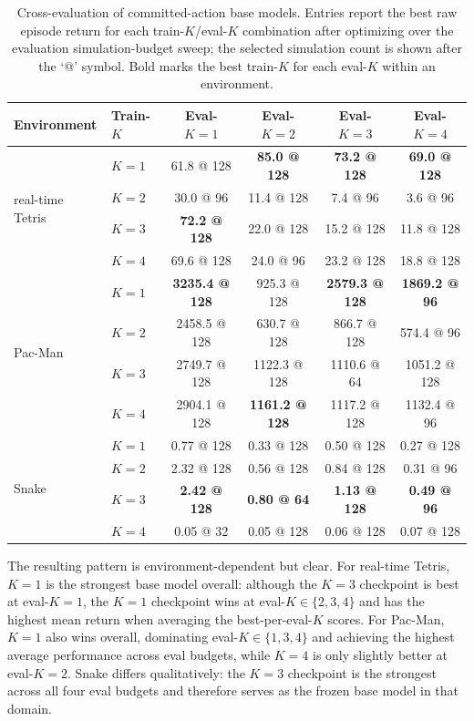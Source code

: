 \documentclass{article}
\begin{document}
\begin{table}[h]
  \centering
  \small
  \setlength{\tabcolsep}{5pt}
  \begin{tabular}{llcccc}
    \toprule
    Environment & Train-$K$ & Eval-$K{=}1$ & Eval-$K{=}2$ & Eval-$K{=}3$ & Eval-$K{=}4$ \\
    \midrule
    \multirow{4}{*}{real-time Tetris}
      & $K{=}1$ & 61.8 @ 128 & \textbf{85.0 @ 128} & \textbf{73.2 @ 128} & \textbf{69.0 @ 128} \\
      & $K{=}2$ & 30.0 @ 96  & 11.4 @ 128          & 7.4 @ 96            & 3.6 @ 96 \\
      & $K{=}3$ & \textbf{72.2 @ 128} & 22.0 @ 128 & 15.2 @ 128 & 11.8 @ 128 \\
      & $K{=}4$ & 69.6 @ 128 & 24.0 @ 96           & 23.2 @ 128          & 18.8 @ 128 \\
    \midrule
    \multirow{4}{*}{Pac-Man}
      & $K{=}1$ & \textbf{3235.4 @ 128} & 925.3 @ 128 & \textbf{2579.3 @ 128} & \textbf{1869.2 @ 96} \\
      & $K{=}2$ & 2458.5 @ 128 & 630.7 @ 128 & 866.7 @ 128 & 574.4 @ 96 \\
      & $K{=}3$ & 2749.7 @ 128 & 1122.3 @ 128 & 1110.6 @ 64 & 1051.2 @ 128 \\
      & $K{=}4$ & 2904.1 @ 128 & \textbf{1161.2 @ 128} & 1117.2 @ 128 & 1132.4 @ 96 \\
    \midrule
    \multirow{4}{*}{Snake}
      & $K{=}1$ & 0.77 @ 128 & 0.33 @ 128 & 0.50 @ 128 & 0.27 @ 128 \\
      & $K{=}2$ & 2.32 @ 128 & 0.56 @ 128 & 0.84 @ 128 & 0.31 @ 96 \\
      & $K{=}3$ & \textbf{2.42 @ 128} & \textbf{0.80 @ 64} & \textbf{1.13 @ 128} & \textbf{0.49 @ 96} \\
      & $K{=}4$ & 0.05 @ 32  & 0.05 @ 128 & 0.06 @ 128 & 0.07 @ 128 \\
    \bottomrule
  \end{tabular}
  \caption{
    Cross-evaluation of committed-action base models.
    Entries report the best raw episode return for each train-$K$/eval-$K$
    combination after optimizing over the evaluation simulation-budget sweep;
    the selected simulation count is shown after the `@' symbol. Bold marks the
    best train-$K$ for each eval-$K$ within an environment.}
\end{table}

The resulting pattern is environment-dependent but clear.
For real-time Tetris, $K{=}1$ is the strongest base model overall: although the
$K{=}3$ checkpoint is best at eval-$K{=}1$, the $K{=}1$ checkpoint wins at
eval-$K \in \{2,3,4\}$ and has the highest mean return when averaging the
best-per-eval-$K$ scores.
For Pac-Man, $K{=}1$ also wins overall, dominating eval-$K \in \{1,3,4\}$ and
achieving the highest average performance across eval budgets, while $K{=}4$
is only slightly better at eval-$K{=}2$.
Snake differs qualitatively: the $K{=}3$ checkpoint is the strongest across all
four eval budgets and therefore serves as the frozen base model in that domain.
\end{document}
